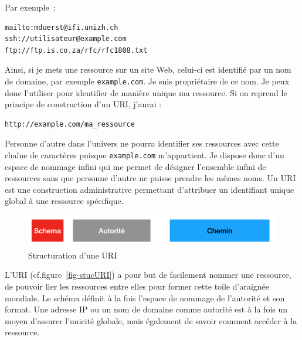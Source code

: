 Par exemple~:

\begin{lstlisting}[backgroundcolor = \color{yellow!20}, 
                    basicstyle= \ttfamily]
mailto:mduerst@ifi.unizh.ch
ssh://utilisateur@example.com
ftp://ftp.is.co.za/rfc/rfc1808.txt
\end{lstlisting}

      \vspace{1em}

Ainsi, si je mets une ressource sur un site Web, celui-ci est identifié par un nom de domaine, par exemple \texttt{example.com}. Je suis propriétaire de ce nom. Je peux donc l’utiliser pour identifier de manière unique ma ressource. Si on reprend le principe de construction d’un URI, j’aurai :

\begin{lstlisting}[backgroundcolor = \color{yellow!20}, 
                    basicstyle= \ttfamily]
http://example.com/ma_ressource
\end{lstlisting}

Personne d’autre dans l’univers ne pourra identifier ses ressources avec cette chaîne de caractères puisque \texttt{example.com} m’appartient. Je dispose donc d’un espace de nommage infini qui me permet de désigner l’ensemble infini de ressources sans que personne d’autre ne puisse prendre les mêmes noms. Un \ac{URI} est une construction administrative permettant d’attribuer un identifiant unique global à une ressource spécifique.


  \begin{figure}[tbp]
\centerline{\includegraphics[width=1\columnwidth]{Pictures/Capture15.png}}
\caption{Structuration d'une URI}
\label{fig-stucURI}
\end{figure}

L’\ac{URI} (cf.figure~\vref{fig-stucURI}) a pour but de facilement nommer une ressource, de pouvoir lier les ressources entre elles pour former cette toile d’araignée mondiale. Le schéma définit à la fois l'espace de nommage de l'autorité et son format. Une adresse \ac{IP} ou un nom de domaine comme autorité est à la fois un moyen d'assurer l'unicité globale, mais également de savoir comment accéder à la ressource. 

      \vspace{1em}

